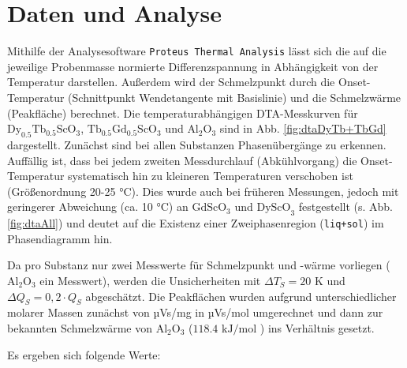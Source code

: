 \documentclass[aps,twocolumn,secnumarabic,nobalancelastpage,amsmath,amssymb,
nofootinbib,superscriptaddress]{revtex4-1}
\begin{document}

\section{Daten und Analyse}
\noindent Mithilfe der Analysesoftware \texttt{Proteus Thermal Analysis} lässt sich die auf die jeweilige Probenmasse normierte Differenzspannung in
Abhängigkeit von der Temperatur darstellen. Außerdem wird der Schmelzpunkt durch die Onset-Temperatur (Schnittpunkt Wendetangente mit Basislinie) \cite{versuchsbeschr} und die Schmelzwärme (Peakfläche)
berechnet. Die temperaturabhängigen DTA-Messkurven für $\text{Dy}_{0.5}\text{Tb}_{0.5}\text{ScO}_3$, $\text{Tb}_{0.5}\text{Gd}_{0.5}\text{ScO}_3$ und $\text{Al}_{2}\text{O}_3$ sind in Abb. \ref{fig:dtaDyTb+TbGd} dargestellt.
\newline\newline Zunächst sind bei allen Substanzen Phasenübergänge zu erkennen. Auffällig ist, dass bei jedem zweiten Messdurchlauf (Abkühlvorgang) die Onset-Temperatur systematisch hin zu kleineren Temperaturen verschoben ist (Größenordnung 20-25 °C).
Dies wurde auch bei früheren Messungen, jedoch mit geringerer Abweichung (ca. 10 °C) an $\text{GdScO}_3$ und $\text{DyScO}_3$ festgestellt (s. Abb. \ref{fig:dtaAll}) und deutet auf die Existenz einer Zweiphasenregion (\texttt{liq+sol}) im Phasendiagramm hin.

Da pro Substanz nur zwei Messwerte für Schmelzpunkt und -wärme vorliegen ($\text{Al}_2\text{O}_3$ ein Messwert), werden die Unsicherheiten mit $\Delta T_S=20\text{ K}$ und $\Delta Q_S=0,2\cdot Q_S$ abgeschätzt.
Die Peakflächen wurden aufgrund unterschiedlicher molarer Massen zunächst von µVs/mg in µVs/mol umgerechnet und dann zur bekannten Schmelzwärme von $\text{Al}_2\text{O}_3$ ($118.4\text{ kJ/mol}$ \cite{schmelzwAl2O3}) ins Verhältnis gesetzt.

Es ergeben sich folgende Werte:
\end{document}
